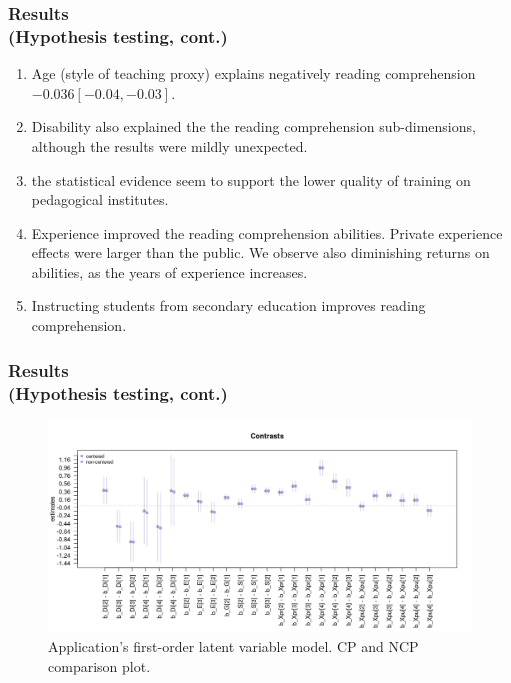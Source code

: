 \documentclass[arial,12pt,xcolor=dvipsnames]{beamer}
\begin{document}
%
\begin{frame}
	\frametitle{Results \\
		(Hypothesis testing, cont.)}
	\begin{enumerate}
		\item Age (style of teaching proxy) explains negatively reading comprehension $-0.036[-0.04, -0.03]$.
		\item Disability also explained the the reading comprehension sub-dimensions, although the results were mildly unexpected. 
		\item the statistical evidence seem to support the lower quality of training on pedagogical institutes.
		\item Experience improved the reading comprehension abilities. Private experience effects were larger than the public. We observe also diminishing returns on abilities, as the years of experience increases.
		\item Instructing students from secondary education improves reading comprehension.
	\end{enumerate} 
\end{frame}
%
\begin{frame}
	\frametitle{Results \\
		(Hypothesis testing, cont.)}
	\begin{figure}[H]
		\centering
		\includegraphics[width=1\linewidth]{FOLV_recovery_contrast}
		\caption{Application's first-order latent variable model. CP and NCP comparison plot.}
		\label{fig:contrast_both}
	\end{figure}
\end{frame}
%
%
\end{document}
